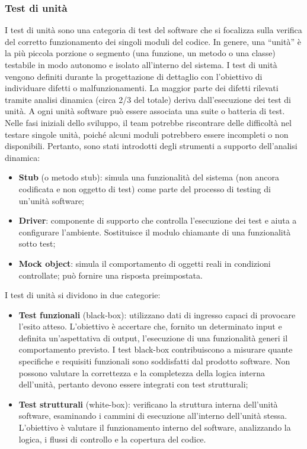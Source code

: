 \subsubsection{Test di unità}
\par I test di unità sono una categoria di test del software che si focalizza sulla verifica del corretto funzionamento dei singoli moduli del codice. In genere, una “unità” è la più piccola porzione o segmento (una funzione, un metodo o una classe) testabile in modo autonomo e isolato all’interno del sistema. I test di unità vengono definiti durante la progettazione di dettaglio con l’obiettivo di individuare difetti o malfunzionamenti. La maggior parte dei difetti rilevati tramite analisi dinamica (circa 2/3 del totale) deriva dall’esecuzione dei test di unità. A ogni unità software può essere associata una suite o batteria di test. Nelle fasi iniziali dello sviluppo, il team potrebbe riscontrare delle difficoltà nel testare singole unità, poiché alcuni moduli potrebbero essere incompleti o non disponibili. Pertanto, sono stati introdotti degli strumenti a supporto dell'analisi dinamica:
\begin{itemize}
  \item \textbf{Stub} (o metodo stub): simula una funzionalità del sistema (non ancora codificata e non oggetto di test) come parte del processo di testing di un’unità software;
  \item \textbf{Driver}: componente di supporto che controlla l'esecuzione dei test e aiuta a configurare l'ambiente. Sostituisce il modulo chiamante di una funzionalità sotto test;
  \item \textbf{Mock object}: simula il comportamento di oggetti reali in condizioni controllate; può fornire una risposta preimpostata.
\end{itemize}

\vspace{0.5\baselineskip}
\par I test di unità si dividono in due categorie:
\begin{itemize}
  \item \textbf{Test funzionali} (black-box): utilizzano dati di ingresso capaci di provocare l’esito atteso. L'obiettivo è accertare che, fornito un determinato input e definita un'aspettativa di output, l'esecuzione di una funzionalità generi il comportamento previsto. I test black-box contribuiscono a misurare quante specifiche e requisiti funzionali sono soddisfatti dal prodotto software. Non possono valutare la correttezza e la completezza della logica interna dell’unità, pertanto devono essere integrati con test strutturali;
  \item \textbf{Test strutturali} (white-box): verificano la struttura interna dell’unità software, esaminando i cammini di esecuzione all’interno dell’unità stessa. L'obiettivo è valutare il funzionamento interno del software, analizzando la logica, i flussi di controllo e la copertura del codice.
\end{itemize}

